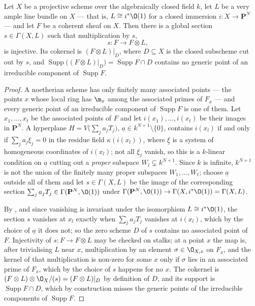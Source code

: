 \begin{lemma}
\label{lem:deg-general-hyperplane}
Let $X$ be a projective scheme over the algebraically closed field $k$, let $L$
be a very ample line bundle on $X$ --- that is, $L\cong i^*\O(1)$ for a closed
immersion $i\colon X\to\mathbf P^N$ --- and let $F$ be a coherent sheaf on
$X$.  Then there is a global section $s\in\Gamma(X,L)$ such that
multiplication by $s$,
\[
  s\colon F\longrightarrow F\otimes L,
\]
is injective.  Its cokernel is $(F\otimes L)|_D$, where $D\subseteq X$ is the
closed subscheme cut out by $s$, and $\operatorname{Supp}\bigl((F\otimes
L)|_D\bigr)=\operatorname{Supp}F\cap D$ contains no generic point of an
irreducible component of $\operatorname{Supp}F$.
\end{lemma}
\begin{proof}
A noetherian scheme has only finitely many associated points --- the points
$x$ whose local ring has $\m_x$ among the associated primes of $F_x$ --- and
every generic point of an irreducible component of $\operatorname{Supp}F$ is
one of them.  Let $x_1,\dots,x_t$ be the associated points of $F$ and let
$i(x_1),\dots,i(x_t)$ be their images in $\mathbf P^N$.  A hyperplane
$H=V\bigl(\sum_ja_jT_j\bigr)$, $\underline a\in k^{N+1}\setminus\{0\}$,
contains $i(x_l)$ if and only if $\sum_ja_j\xi_j=0$ in the residue field
$\kappa(i(x_l))$, where $\underline\xi$ is a system of homogeneous coordinates
of $i(x_l)$; not all $\xi_j$ vanish, so this is a $k$-linear condition on
$\underline a$ cutting out a \emph{proper} subspace $W_l\subsetneq k^{N+1}$.
Since $k$ is infinite, $k^{N+1}$ is not the union of the finitely many proper
subspaces $W_1,\dots,W_t$; choose $\underline a$ outside all of them and let
$s\in\Gamma(X,L)$ be the image of the corresponding section
$\sum_ja_jT_j\in\Gamma(\mathbf P^N,\O(1))$ under
$\Gamma(\mathbf P^N,\O(1))\to\Gamma(X,i^*\O(1))=\Gamma(X,L)$.

By , and since vanishing is invariant under
the isomorphism $L\cong i^*\O(1)$, the section $s$ vanishes at $x_l$ exactly
when $\sum_ja_jT_j$ vanishes at $i(x_l)$, which by the choice of $\underline a$
it does not; so the zero scheme $D$ of $s$ contains no associated point of
$F$.  Injectivity of $s\colon F\to F\otimes L$ may be checked on stalks; at a
point $x$ the map is, after trivialising $L$ near $x$, multiplication by an
element $\sigma\in\O_{X,x}$ on $F_x$, and the kernel of that multiplication is
non-zero for some $x$ only if $\sigma$ lies in an associated prime of $F_x$,
which by the choice of $s$ happens for no $x$.  The cokernel is
$(F\otimes L)\otimes\O_X/(s)=(F\otimes L)|_D$ by definition of $D$, and its
support is $\operatorname{Supp}F\cap D$, which by construction misses the
generic points of the irreducible components of $\operatorname{Supp}F$.
\end{proof}

